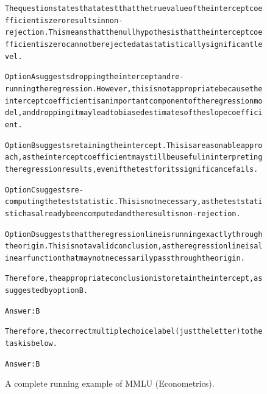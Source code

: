 \begin{figure}[t]
{{\begin{alltt}
The question states that a test that the true value of the intercept coefficient is zero results in non-rejection. This means that the null hypothesis that the intercept coefficient is zero cannot be rejected at a statistically significant level.

Option A suggests dropping the intercept and re-running the regression. However, this is not appropriate because the intercept coefficient is an important component of the regression model, and dropping it may lead to biased estimates of the slope coefficient.

Option B suggests retaining the intercept. This is a reasonable approach, as the intercept coefficient may still be useful in interpreting the regression results, even if the test for its significance fails.

Option C suggests re-computing the test statistic. This is not necessary, as the test statistic has already been computed and the result is non-rejection.

Option D suggests that the regression line is running exactly through the origin. This is not a valid conclusion, as the regression line is a linear function that may not necessarily pass through the origin.

Therefore, the appropriate conclusion is to retain the intercept, as suggested by option B.

Answer: B

Therefore, the correct multiple choice label (just the letter) to the task is below.

Answer: B
\end{alltt}
}}
\caption{A complete running example of MMLU (Econometrics).}
\label{fig:mmlu_subject=econometrics_example}
\end{figure}
